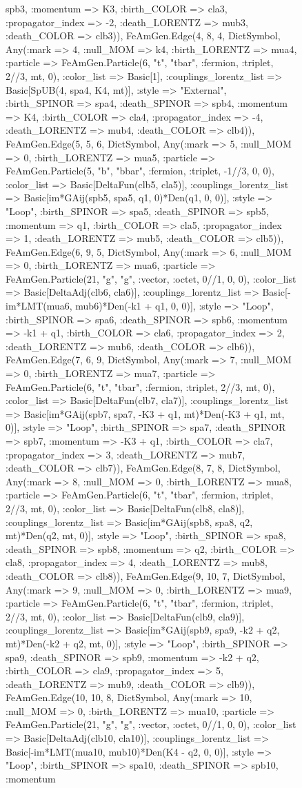 \documentclass{revtex4}
\begin{document}
\begin{figure}[!htb]
\begin{center}
{spb3, :momentum => K3, :birth_COLOR => cla3, :propagator_index => -2, :death_LORENTZ => mub3, :death_COLOR => clb3)), FeAmGen.Edge(4, 8, 4, Dict{Symbol, Any}(:mark => 4, :null_MOM => k4, :birth_LORENTZ => mua4, :particle => FeAmGen.Particle(6, "t", "tbar", :fermion, :triplet, 2//3, mt, 0), :color_list => Basic[1], :couplings_lorentz_list => Basic[SpUB(4, spa4, K4, mt)], :style => "External", :birth_SPINOR => spa4, :death_SPINOR => spb4, :momentum => K4, :birth_COLOR => cla4, :propagator_index => -4, :death_LORENTZ => mub4, :death_COLOR => clb4)), FeAmGen.Edge(5, 5, 6, Dict{Symbol, Any}(:mark => 5, :null_MOM => 0, :birth_LORENTZ => mua5, :particle => FeAmGen.Particle(5, "b", "bbar", :fermion, :triplet, -1//3, 0, 0), :color_list => Basic[DeltaFun(clb5, cla5)], :couplings_lorentz_list => Basic[im*GAij(spb5, spa5, q1, 0)*Den(q1, 0, 0)], :style => "Loop", :birth_SPINOR => spa5, :death_SPINOR => spb5, :momentum => q1, :birth_COLOR => cla5, :propagator_index => 1, :death_LORENTZ => mub5, :death_COLOR => clb5)), FeAmGen.Edge(6, 9, 5, Dict{Symbol, Any}(:mark => 6, :null_MOM => 0, :birth_LORENTZ => mua6, :particle => FeAmGen.Particle(21, "g", "g", :vector, :octet, 0//1, 0, 0), :color_list => Basic[DeltaAdj(clb6, cla6)], :couplings_lorentz_list => Basic[-im*LMT(mua6, mub6)*Den(-k1 + q1, 0, 0)], :style => "Loop", :birth_SPINOR => spa6, :death_SPINOR => spb6, :momentum => -k1 + q1, :birth_COLOR => cla6, :propagator_index => 2, :death_LORENTZ => mub6, :death_COLOR => clb6)), FeAmGen.Edge(7, 6, 9, Dict{Symbol, Any}(:mark => 7, :null_MOM => 0, :birth_LORENTZ => mua7, :particle => FeAmGen.Particle(6, "t", "tbar", :fermion, :triplet, 2//3, mt, 0), :color_list => Basic[DeltaFun(clb7, cla7)], :couplings_lorentz_list => Basic[im*GAij(spb7, spa7, -K3 + q1, mt)*Den(-K3 + q1, mt, 0)], :style => "Loop", :birth_SPINOR => spa7, :death_SPINOR => spb7, :momentum => -K3 + q1, :birth_COLOR => cla7, :propagator_index => 3, :death_LORENTZ => mub7, :death_COLOR => clb7)), FeAmGen.Edge(8, 7, 8, Dict{Symbol, Any}(:mark => 8, :null_MOM => 0, :birth_LORENTZ => mua8, :particle => FeAmGen.Particle(6, "t", "tbar", :fermion, :triplet, 2//3, mt, 0), :color_list => Basic[DeltaFun(clb8, cla8)], :couplings_lorentz_list => Basic[im*GAij(spb8, spa8, q2, mt)*Den(q2, mt, 0)], :style => "Loop", :birth_SPINOR => spa8, :death_SPINOR => spb8, :momentum => q2, :birth_COLOR => cla8, :propagator_index => 4, :death_LORENTZ => mub8, :death_COLOR => clb8)), FeAmGen.Edge(9, 10, 7, Dict{Symbol, Any}(:mark => 9, :null_MOM => 0, :birth_LORENTZ => mua9, :particle => FeAmGen.Particle(6, "t", "tbar", :fermion, :triplet, 2//3, mt, 0), :color_list => Basic[DeltaFun(clb9, cla9)], :couplings_lorentz_list => Basic[im*GAij(spb9, spa9, -k2 + q2, mt)*Den(-k2 + q2, mt, 0)], :style => "Loop", :birth_SPINOR => spa9, :death_SPINOR => spb9, :momentum => -k2 + q2, :birth_COLOR => cla9, :propagator_index => 5, :death_LORENTZ => mub9, :death_COLOR => clb9)), FeAmGen.Edge(10, 10, 8, Dict{Symbol, Any}(:mark => 10, :null_MOM => 0, :birth_LORENTZ => mua10, :particle => FeAmGen.Particle(21, "g", "g", :vector, :octet, 0//1, 0, 0), :color_list => Basic[DeltaAdj(clb10, cla10)], :couplings_lorentz_list => Basic[-im*LMT(mua10, mub10)*Den(K4 - q2, 0, 0)], :style => "Loop", :birth_SPINOR => spa10, :death_SPINOR => spb10, :momentum }
\end{center}
\end{figure}
\end{document}
